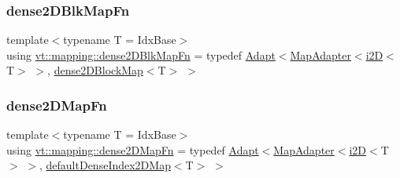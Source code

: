 \mbox{\label{namespacevt_1_1mapping_adfd6b43dd7e4a4dbb66ee9065ca4bc3a}} 
\subsubsection{\texorpdfstring{dense2\+D\+Blk\+Map\+Fn}{dense2DBlkMapFn}}
{\footnotesize\ttfamily template$<$typename T  = Idx\+Base$>$ \\
using \hyperlink{namespacevt_1_1mapping_adfd6b43dd7e4a4dbb66ee9065ca4bc3a}{vt\+::mapping\+::dense2\+D\+Blk\+Map\+Fn} = typedef \hyperlink{namespacevt_1_1mapping_ab3efa0ad45a85d80210d4acef3bb6c22}{Adapt}$<$\hyperlink{namespacevt_1_1mapping_a41b113c28bb6430fbcb5be66e08ccf9f}{Map\+Adapter}$<$\hyperlink{namespacevt_1_1mapping_a6448c875e0807b43f31e96fc5b0cec04}{i2D}$<$T$>$ $>$, \hyperlink{namespacevt_1_1mapping_aca20bcd20c24f4a43e217ca63bf5812c}{dense2\+D\+Block\+Map}$<$T$>$ $>$}

\mbox{\label{namespacevt_1_1mapping_aa9d0a056d56894602a35dfb8befdd812}} 
\subsubsection{\texorpdfstring{dense2\+D\+Map\+Fn}{dense2DMapFn}}
{\footnotesize\ttfamily template$<$typename T  = Idx\+Base$>$ \\
using \hyperlink{namespacevt_1_1mapping_aa9d0a056d56894602a35dfb8befdd812}{vt\+::mapping\+::dense2\+D\+Map\+Fn} = typedef \hyperlink{namespacevt_1_1mapping_ab3efa0ad45a85d80210d4acef3bb6c22}{Adapt}$<$\hyperlink{namespacevt_1_1mapping_a41b113c28bb6430fbcb5be66e08ccf9f}{Map\+Adapter}$<$\hyperlink{namespacevt_1_1mapping_a6448c875e0807b43f31e96fc5b0cec04}{i2D}$<$T$>$ $>$, \hyperlink{namespacevt_1_1mapping_a011c4e2cb832d3edcd98e3803d405ad4}{default\+Dense\+Index2\+D\+Map}$<$T$>$ $>$}

\mbox{\label{namespacevt_1_1mapping_a6038870f6fcb87803b82114c71e6aa9b}} 
